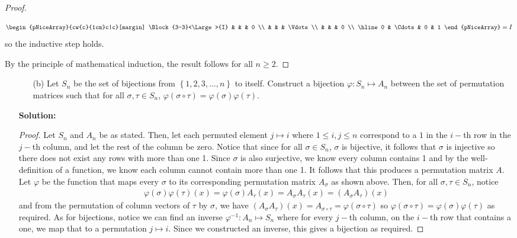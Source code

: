 \documentclass[letterpaper,12pt]{article}
\newcommand{\set}[1]{\left\{ #1 \right\}}
\theoremstyle{definition}
\begin{document}
\begin{enumerate}
\begin{mdframed}
\begin{proof}
\begin{itemize}
\begin{align*}
\begin{pNiceArray}{cw{c}{1cm}c|c}[margin]
\Block{3-3}<\Large>{I} & & & 0 \\
& & & \Vdots \\
& & & 0 \\
\hline
0 & \Cdots& 0 & 1
\end{pNiceArray} = I
        \end{align*}
        so the inductive step holds.
        \end{itemize}
        By the principle of mathematical induction, the result follows for all $n \geq 2$.
        \end{proof}
    \end{mdframed}
\end{enumerate}
\pagebreak
\begin{enumerate}
    \item[] \begin{enumerate}
        \item[(b)] Let $S_n$ be the set of bijections from $\set{1,2,3,\ldots,n}$ to itself. Construct a bijection $\varphi: S_n \mapsto A_n$ between the set of permutation matrices such that for all $\sigma,\tau \in S_n$, $\varphi(\sigma \circ \tau) = \varphi(\sigma)\varphi(\tau)$.
    \end{enumerate}
    \begin{mdframed}
        \textbf{Solution:}
        \begin{proof}
            Let $S_n$ and $A_n$ be as stated. Then, let each permuted element $j \mapsto i$ where $1 \leq i, j \leq n$ correspond to a $1$ in the $i-$th row in the $j-$th column, and let the rest of the column be zero. Notice that since for all $\sigma \in S_n$, $\sigma$ is bijective, it follows that $\sigma$ is injective so there does not exist any rows with more than one 1. Since $\sigma$ is also surjective, we know every column contains 1 and by the well-definition of a function, we know each column cannot contain more than one 1. It follows that this produces a permutation matrix $A$. Let $\varphi$ be the function that maps every $\sigma$ to its corresponding permutation matrix $A_\sigma$ as shown above. Then, for all $\sigma, \tau \in S_n$, notice \begin{align*}
                \varphi(\sigma)\varphi(\tau)(x) = \varphi(\sigma)A_\tau (x) = A_\sigma A_\tau (x) = (A_\sigma A_\tau)(x)
            \end{align*}
            and from the permutation of column vectors of $\tau$ by $\sigma$,  we have $(A_\sigma A_\tau)(x) = A_{\sigma \circ \tau} = \varphi(\sigma \circ \tau)$ so $\varphi(\sigma \circ \tau) = \varphi(\sigma)\varphi(\tau)$ as required. As for bijections, notice we can find an inverse $\varphi^{-1} : A_n \mapsto S_n$ where for every $j-$th column, on the $i-$th row that contains a one, we map that to a permutation $j \mapsto i$. Since we constructed an inverse, this gives a bijection as required.
        \end{proof}
    \end{mdframed}
\end{enumerate}
\end{document}
